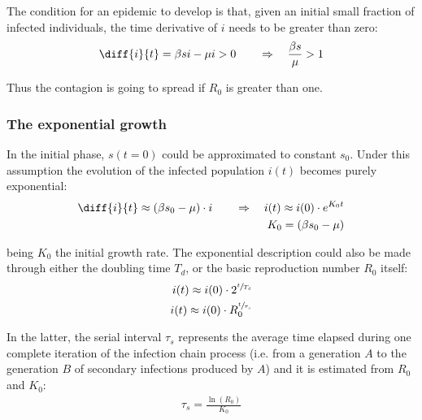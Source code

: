 \documentclass[DIV=12, BCOR=0pt]{scrartcl}  %
\begin{document}
  The condition for an epidemic to develop is that, given an initial small fraction of infected individuals, the time derivative of $i$ needs to be greater than zero:
  \begin{align}
  	\diff{i}{t} = \beta s i - \mu i > 0 \qquad \Rightarrow \quad 	\frac{\beta s}{\mu} > 1  %
  \end{align}
  
  Thus the contagion is going to spread if $R_0$ is greater than one. 



  \subsubsection{The exponential growth}
  
 
  
  In the initial phase, $s(t=0)$ could be approximated to constant $s_0$. %
  Under this assumption the evolution of the infected population $i(t)$ becomes purely exponential:
  \begin{align}
  	\diff{i}{t} \approx  (\beta s_0 - \mu) \cdot i \qquad \Rightarrow \quad 	i(t) \approx i(0) \cdot e^{K_0 t}\\ %
  	K_0 = (\beta s_0 - \mu)
  \end{align}
	
	being $K_0$ the initial growth rate. The exponential description could also be made through either the doubling time $T_{d}$, or the basic reproduction number $R_0$ itself:
	\begin{align}
		i(t) \approx i(0) \cdot 2^{\sfrac{t}{T_{d}}} \\ %
		i(t) \approx i(0) \cdot R_0^{\sfrac{t}{\tau_{s}}}
	\end{align}
	
	In the latter, the serial interval $\tau_{s}$ represents the average time elapsed during one complete iteration of the infection chain process (i.e. from a generation $A$ to the generation $B$ of secondary infections produced by $A$) and it is estimated from $R_0$ and $K_0$: 
	\begin{align}
		\tau_{s} = \frac{\ln(R_0)}{K_0}
	\end{align}
\end{document}
